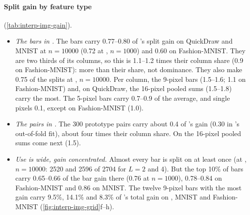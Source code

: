 \begin{table}[tbp]
\centering{\footnotesize\setlength{\tabcolsep}{4pt}
}
\caption{Split gain by feature type in the final boosters, $n=10000$, seed 0 . Each entry is the type's share of the booster's total split gain, with its ratio to the type's share of the columns in brackets (1.0: as much gain per column as the booster's average). Bars are two thirds of 's columns; the 300 prototype pairs are about a tenth of 's. LightGBM samples 5\% () or 12\% () of the columns per tree.  on  and MNIST, an out-of-fold fit, is not shown (pairs 0.30 and 0.41 of its gain). Split gain describes how the trees split, not what the predictions depend on. Source: the analysis files in .}
\label{tab:interp-img-gain}
\end{table}

\paragraph{Split gain by feature type}  (\cref{tab:interp-img-gain}).
\begin{itemize}
\item \emph{The bars in .} The bars carry 0.77--0.80 of 's split gain on QuickDraw and MNIST at $n=10000$ (0.72 at , $n=1000$) and 0.60 on Fashion-MNIST. They are two thirds of its columns, so this is 1.1--1.2 times their column share (0.9 on Fashion-MNIST): more than their share, not dominance. They also make 0.75 of the splits at , $n=10000$. Per column, the 9-pixel bars (1.5--1.6; 1.1 on Fashion-MNIST) and, on QuickDraw, the 16-pixel pooled sums (1.5--1.8) carry the most. The 5-pixel bars carry 0.7--0.9 of the average, and single pixels 0.1, except on Fashion-MNIST (1.0).
\item \emph{The pairs in .} The 300 prototype pairs carry about 0.4 of 's gain (0.30 in 's out-of-fold fit), about four times their column share. On  the 16-pixel pooled sums come next (1.5).
\item \emph{Use is wide, gain concentrated.} Almost every bar is split on at least once (at , $n=10000$: 2520 and 2596 of 2704 for $L=2$ and 4). But the top 10\% of bars carry 0.65--0.66 of the bar gain there (0.76 at $n=1000$), 0.78--0.84 on Fashion-MNIST and 0.86 on MNIST. The twelve 9-pixel bars with the most gain carry 9.5\%, 14.1\% and 8.3\% of 's total gain on , MNIST and Fashion-MNIST (\cref{fig:interp-img-grid}f--h).
\end{itemize}


